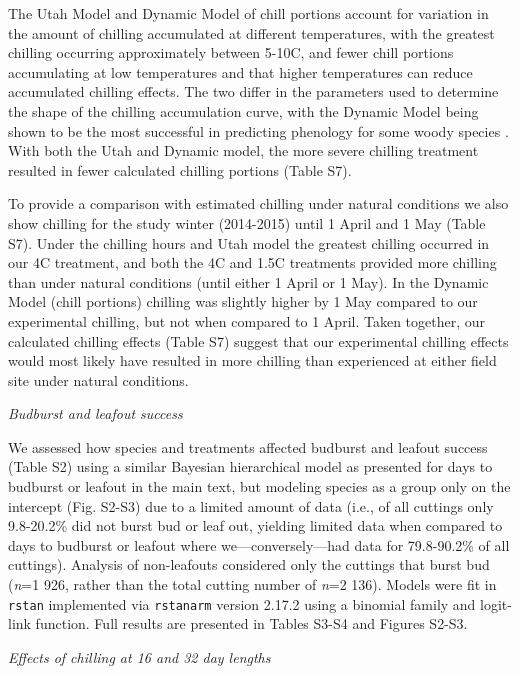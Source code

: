 \documentclass{article}
\begin{document}
\noindent The Utah Model and Dynamic Model of chill portions account for variation in the amount of chilling accumulated at different temperatures, with the greatest chilling occurring approximately between 5-10\degree C, and fewer chill portions accumulating at low temperatures and that higher temperatures can reduce accumulated chilling effects. The two differ in the parameters used to determine the shape of the chilling accumulation curve, with the Dynamic Model being shown to be the most successful in predicting phenology for some woody species \citep{Luedeling:2009}. With both the Utah and Dynamic model, the more severe chilling treatment resulted in fewer calculated chilling portions (Table S7). 

\noindent To provide a comparison with estimated chilling under natural conditions we also show chilling for the study winter (2014-2015) until 1 April and 1 May (Table S7). Under the chilling hours and Utah model the greatest chilling occurred in our 4\degree C treatment, and both the 4\degree C and 1.5\degree C treatments provided more chilling than under natural conditions (until either 1 April or 1 May). In the Dynamic Model (chill portions) chilling was slightly higher by 1 May compared to our experimental chilling, but not when compared to 1 April. Taken together, our calculated chilling effects (Table S7) suggest that our experimental chilling effects would most likely have resulted in more chilling than experienced at either field site under natural conditions. 

\noindent\emph{Budburst and leafout success}

\noindent We assessed how species and treatments affected budburst and leafout success (Table S2) using a similar Bayesian hierarchical model as presented for days to budburst or leafout in the main text, but modeling species as a group only on the intercept (Fig. S2-S3) due to a limited amount of data (i.e., of all cuttings only 9.8-20.2\% did not burst bud or leaf out, yielding limited data when compared to days to budburst or leafout where we---conversely---had data for 79.8-90.2\% of all cuttings). Analysis of non-leafouts considered only the cuttings that burst bud (\emph{n}=1 926, rather than the total cutting number of \emph{n}=2 136). Models were fit in \verb|rstan| implemented via  \verb|rstanarm| version 2.17.2 using a binomial family and logit-link function. Full results are presented in Tables S3-S4 and Figures S2-S3.

\noindent\emph{Effects of chilling at 16 and 32 day lengths}
\end{document}
